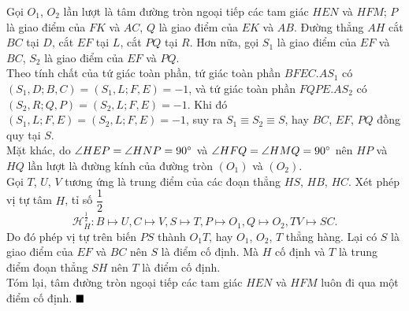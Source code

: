\documentclass{article} %
\newenvironment{solution}[1][Lời giải]{%
  \proof[\faPenNib \hspace{0.2cm} \ttfamily \scshape \large #1]%
}{\(\hfill \blacksquare\){\parfillskip0pt\par}}
\begin{document}
\begin{center}
        \end{center}

        \begin{solution}
            Gọi \(O_1\), \(O_2\) lần lượt là tâm đường tròn ngoại tiếp các tam giác \(HEN\) và \(HFM\); \(P\) là giao điểm của \(FK\) và \(AC\), \(Q\) là giao điểm của \(EK\) và \(AB\). Đường thẳng \(AH\) cắt \(BC\) tại \(D\), cắt \(EF\) tại \(L\), cắt \(PQ\) tại \(R\). Hơn nữa, gọi \(S_1\) là giao điểm của \(EF\) và \(BC\), \(S_2\) là giao điểm của \(EF\) và \(PQ\).\\
            Theo tính chất của tứ giác toàn phần, tứ giác toàn phần \(BFEC.AS_1\) có \((S_1,D;B,C) = (S_1,L;F,E) = -1\), và tứ giác toàn phần \(FQPE.AS_2\) có \((S_2,R;Q,P) = (S_2,L;F,E) = -1\). Khi đó \((S_1,L;F,E) = (S_2,L;F,E) = -1\), suy ra \(S_1 \equiv S_2 \equiv S\), hay \(BC\), \(EF\), \(PQ\) đồng quy tại \(S\).\\
            Mặt khác, do \(\angle HEP = \angle HNP = 90 \degree\) và \(\angle HFQ = \angle HMQ = 90 \degree\) nên \(HP\) và \(HQ\) lần lượt là đường kính của đường tròn \((O_1)\) và \((O_2)\).\\
            Gọi \(T\), \(U\), \(V\) tương ứng là trung điểm của các đoạn thẳng \(HS\), \(HB\), \(HC\). Xét phép vị tự tâm \(H\), tỉ số \(\dfrac{1}{2}\)
            \[\mathcal{H}_{H}^{\frac{1}{2}}: B \mapsto U, C \mapsto V, S \mapsto T, P \mapsto O_1, Q \mapsto O_2, TV \mapsto SC.\]
            Do đó phép vị tự trên biến \(PS\) thành \(O_1T\), hay \(O_1\), \(O_2\), \(T\) thẳng hàng. Lại có \(S\) là giao điểm của \(EF\) và \(BC\) nên \(S\) là điểm cố định. Mà \(H\) cố định và \(T\) là trung điểm đoạn thẳng \(SH\) nên \(T\) là điểm cố định.\\
            Tóm lại, tâm đường tròn ngoại tiếp các tam giác \(HEN\) và \(HFM\) luôn đi qua một điểm cố định.
        \end{solution}
\end{document}

